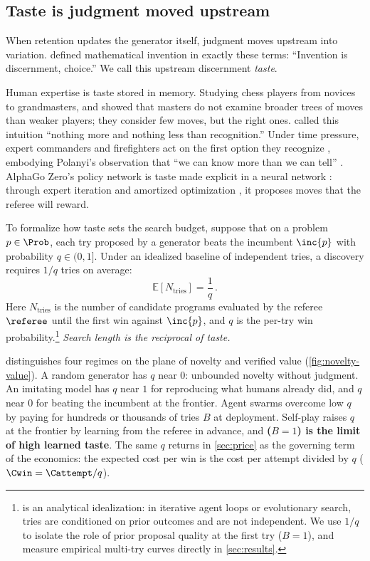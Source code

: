 \subsection{Taste is judgment moved upstream}\label{sub:anatomy-taste}

When retention updates the generator itself, judgment moves upstream into variation. \citet[p.~324]{poincare1910creation} defined mathematical invention in exactly these terms: ``Invention is discernment, choice.'' We call this upstream discernment \emph{taste}.

Human expertise is taste stored in memory. Studying chess players from novices to grandmasters, \citet{degroot1965thought} and \citet{chase1973perception} showed that masters do not examine broader trees of moves than weaker players; they consider few moves, but the right ones. \citet[p.~155]{simon1992explanation} called this intuition ``nothing more and nothing less than recognition.'' Under time pressure, expert commanders and firefighters act on the first option they recognize \citep{klein1998sources,kahneman2011thinking}, embodying Polanyi's observation that ``we can know more than we can tell'' \citep[p.~4]{polanyi1966tacit}. AlphaGo Zero's policy network is taste made explicit in a neural network \citep{silver2017mastering}: through expert iteration \citep{anthony2017expert} and amortized optimization \citep{amos2023amortized}, it proposes moves that the referee will reward.

To formalize how taste sets the search budget, suppose that on a problem $p \in \Prob$, each try proposed by a generator beats the incumbent $\inc{p}$ with probability $q \in (0, 1]$. Under an idealized baseline of independent tries, a discovery requires $1/q$ tries on average:
\begin{equation}
  \mathbb{E}[N_{\text{tries}}] = \frac{1}{q}\,.
  \label{eq:taste}
\end{equation}
Here $N_{\text{tries}}$ is the number of candidate programs evaluated by the referee $\referee$ until the first win against $\inc{p}$, and $q$ is the per-try win probability.\footnote{ is an analytical idealization: in iterative agent loops or evolutionary search, tries are conditioned on prior outcomes and are not independent. We use $1/q$ to isolate the role of prior proposal quality at the first try ($B = 1$), and measure empirical multi-try curves directly in \cref{sec:results}.} \emph{Search length is the reciprocal of taste.}

 distinguishes four regimes on the plane of novelty and verified value (\cref{fig:novelty-value}). A random generator has $q$ near $0$: unbounded novelty without judgment. An imitating model has $q$ near $1$ for reproducing what humans already did, and $q$ near $0$ for beating the incumbent at the frontier. Agent swarms overcome low $q$ by paying for hundreds or thousands of tries $B$ at deployment. Self-play raises $q$ at the frontier by learning from the referee in advance, and \textbf{\searchone{} ($B = 1$) is the limit of high learned taste}. The same $q$ returns in \cref{sec:price} as the governing term of the economics: the expected cost per win is the cost per attempt divided by $q$ ($\Cwin = \Cattempt / q$).

